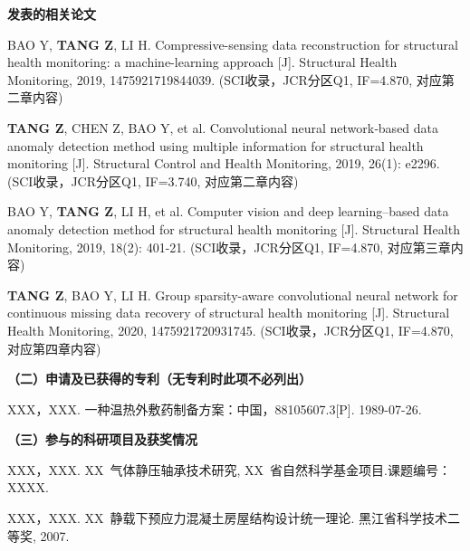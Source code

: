 \begin{publication}
\noindent\textbf{发表的相关论文}
\begin{publist}



\item BAO Y, \textbf{TANG Z}, LI H. Compressive-sensing data reconstruction for structural health monitoring: a machine-learning approach [J]. Structural Health Monitoring, 2019, 1475921719844039. (SCI收录，JCR分区Q1, IF=4.870, 对应第二章内容)

\item \textbf{TANG Z}, CHEN Z, BAO Y, et al. Convolutional neural network‐based data anomaly detection method using multiple information for structural health monitoring [J]. Structural Control and Health Monitoring, 2019, 26(1): e2296. (SCI收录，JCR分区Q1, IF=3.740, 对应第二章内容)

\item BAO Y, \textbf{TANG Z}, LI H, et al. Computer vision and deep learning–based data anomaly detection method for structural health monitoring [J]. Structural Health Monitoring, 2019, 18(2): 401-21. (SCI收录，JCR分区Q1, IF=4.870, 对应第三章内容)

\item \textbf{TANG Z}, BAO Y, LI H. Group sparsity-aware convolutional neural network for continuous missing data recovery of structural health monitoring [J]. Structural Health Monitoring, 2020, 1475921720931745. (SCI收录，JCR分区Q1, IF=4.870, 对应第四章内容)

\end{publist}

\noindent\textbf{（二）申请及已获得的专利（无专利时此项不必列出）}
\begin{publist}
\item XXX，XXX. 一种温热外敷药制备方案：中国，88105607.3[P]. 1989-07-26.
\end{publist}

\noindent\textbf{（三）参与的科研项目及获奖情况}
\begin{publist}
\item	XXX，XXX. XX~气体静压轴承技术研究, XX~省自然科学基金项目.课题编号：XXXX.
\item XXX，XXX. XX~静载下预应力混凝土房屋结构设计统一理论. 黑江省科学技术二等奖, 2007.
\end{publist}
\end{publication}
